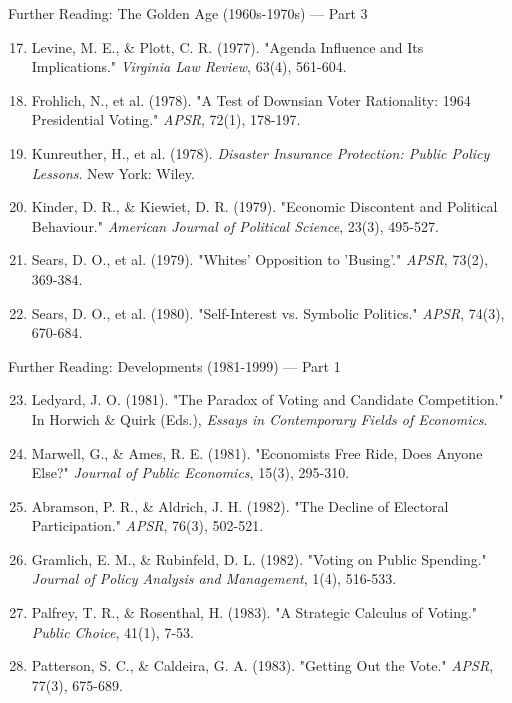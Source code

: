 \documentclass[10pt]{beamer}
\begin{document}
\begin{frame}{Further Reading: The Golden Age (1960s-1970s) — Part 3}
\footnotesize
\begin{enumerate}
\setcounter{enumi}{16}
\item Levine, M. E., \& Plott, C. R. (1977). "Agenda Influence and Its Implications." \emph{Virginia Law Review}, 63(4), 561-604.
\item Frohlich, N., et al. (1978). "A Test of Downsian Voter Rationality: 1964 Presidential Voting." \emph{APSR}, 72(1), 178-197.
\item Kunreuther, H., et al. (1978). \emph{Disaster Insurance Protection: Public Policy Lessons}. New York: Wiley.
\item Kinder, D. R., \& Kiewiet, D. R. (1979). "Economic Discontent and Political Behaviour." \emph{American Journal of Political Science}, 23(3), 495-527.
\item Sears, D. O., et al. (1979). "Whites' Opposition to 'Busing'." \emph{APSR}, 73(2), 369-384.
\item Sears, D. O., et al. (1980). "Self-Interest vs. Symbolic Politics." \emph{APSR}, 74(3), 670-684.
\end{enumerate}
\end{frame}

\begin{frame}{Further Reading: Developments (1981-1999) — Part 1}
\footnotesize
\begin{enumerate}
\setcounter{enumi}{22}
\item Ledyard, J. O. (1981). "The Paradox of Voting and Candidate Competition." In Horwich \& Quirk (Eds.), \emph{Essays in Contemporary Fields of Economics}.
\item Marwell, G., \& Ames, R. E. (1981). "Economists Free Ride, Does Anyone Else?" \emph{Journal of Public Economics}, 15(3), 295-310.
\item Abramson, P. R., \& Aldrich, J. H. (1982). "The Decline of Electoral Participation." \emph{APSR}, 76(3), 502-521.
\item Gramlich, E. M., \& Rubinfeld, D. L. (1982). "Voting on Public Spending." \emph{Journal of Policy Analysis and Management}, 1(4), 516-533.
\item Palfrey, T. R., \& Rosenthal, H. (1983). "A Strategic Calculus of Voting." \emph{Public Choice}, 41(1), 7-53.
\item Patterson, S. C., \& Caldeira, G. A. (1983). "Getting Out the Vote." \emph{APSR}, 77(3), 675-689.
\end{enumerate}
\end{frame}
\end{document}
